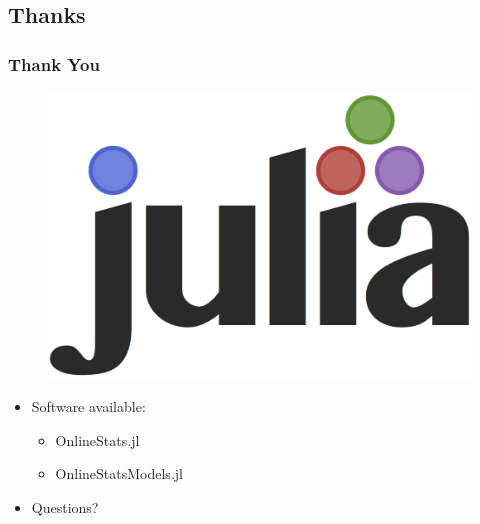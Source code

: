 \documentclass{beamer}
\begin{document}
\subsection{Thanks}
\begin{frame}
  \frametitle{Thank You}
  \begin{figure}
    \includegraphics[width=.2\textwidth]{figures/julia.png}
  \end{figure}
  \begin{itemize}
    \item Software available:
    \begin{itemize}
      \item OnlineStats.jl
      \item OnlineStatsModels.jl
    \end{itemize}
    \item Questions?
  \end{itemize}
\end{frame}




\end{document}
